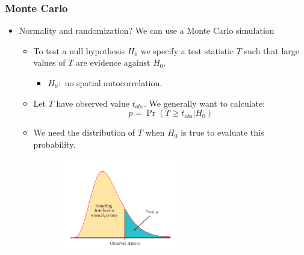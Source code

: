 \documentclass[english,10pt]{beamer}\usepackage[]{graphicx}\usepackage[]{xcolor}
\begin{document}
\begin{frame}
  \frametitle{Monte Carlo}
    \begin{itemize}
      \item Normality and randomization? We can use a Monte Carlo simulation
        \begin{itemize}
          \item To test a null hypothesis $H_0$ we specify a test statistic $T$ such that large values of $T$ are evidence against $H_0$.
          \begin{itemize}
            \item $H_0:$ no spatial autocorrelation. 
          \end{itemize}
          \item Let $T$ have observed value $t_{obs}$. We generally want to calculate:
              \begin{equation}
                p = \Pr(T\geq t_{obs}| H_0)
              \end{equation}
          \item We need the distribution of $T$ when $H_0$ is true to evaluate this probability.
    \end{itemize}
  \end{itemize}
\end{frame}

\begin{frame}
      	\begin{figure}[H]
    		\begin{center}
    			\includegraphics[width=8cm, height=4cm]{p-monte.png}
    		\end{center}
    	\end{figure}
\end{frame}
\end{document}
